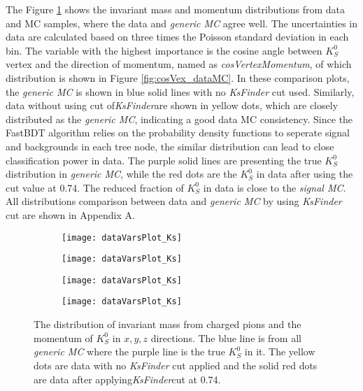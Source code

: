  The Figure \ref{fig:ksvalid_1} shows the invariant mass and momentum distributions from data and MC samples, where the data and \textit{generic MC} agree well. The uncertainties in data are calculated based on three times the Poisson standard deviation in each bin. The variable with the highest importance is the cosine angle between $K_S^0$ vertex and the direction of momentum, named as \textit{cosVertexMomentum}, of which distribution is shown in Figure \ref{fig:cosVex_dataMC}. In these comparison plots, the \textit{generic MC} is shown in blue solid lines with no \textit{KsFinder} cut used. Similarly, data without using cut of\textit{KsFinder}are shown in yellow dots, which are closely distributed as the \textit{generic MC}, indicating a good data MC consistency. Since the FastBDT algorithm relies on the probability density functions to seperate signal and backgrounds in each tree node, the similar distribution can lead to close classification power in data. The purple solid lines are presenting the true $K_S^0$ distribution in \textit{generic MC}, while the red dots are the $K_S^0$ in data after using the cut value at 0.74. The reduced fraction of $K_S^0$ in data  is close to the \textit{signal MC}. All distributions comparison between data and \textit{generic MC} by using  \textit{KsFinder} cut are shown in Appendix A.

\begin{figure}[htpb]
\begin{subfigure}{0.5\linewidth}
\texttt{[image: dataVarsPlot\_Ks]}
\end{subfigure}
\begin{subfigure}{0.5\linewidth}
\texttt{[image: dataVarsPlot\_Ks]}
\end{subfigure}
\bigskip
\begin{subfigure}{0.5\linewidth}
\texttt{[image: dataVarsPlot\_Ks]}
\end{subfigure}
\begin{subfigure}{0.5\linewidth}
\texttt{[image: dataVarsPlot\_Ks]}
\end{subfigure}
\caption{The distribution of invariant mass from charged pions and the momentum of $K_S^0$ in $x,y,z$ directions. The blue line is from all \textit{generic MC} where the purple line is the true $K_S^0$ in it. The yellow dots are data with no \textit{KsFinder} cut applied and the solid red dots are data after applying\textit{KsFinder}cut at 0.74.}
\label{fig:ksvalid_1}
\end{figure}

